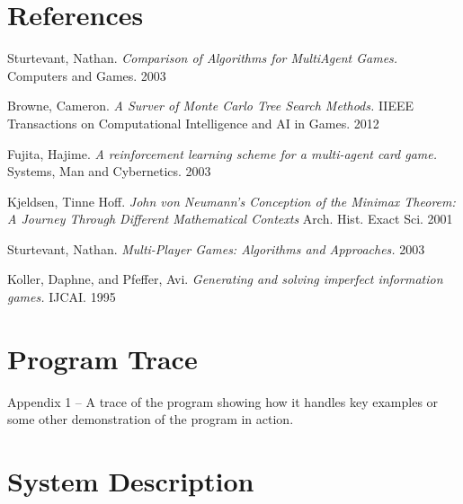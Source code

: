 \documentclass[11pt]{article}
\begin{document}
\section{References}

\begin{thebibliography}{5}

	Sturtevant, Nathan.
	\emph{Comparison of Algorithms for MultiAgent Games.}
	Computers and Games.
	2003

	Browne, Cameron.
	\emph{A Surver of Monte Carlo Tree Search Methods.}
	IIEEE Transactions on Computational Intelligence and AI in Games. 
	2012

	Fujita, Hajime.
	\emph{A reinforcement learning scheme for a multi-agent card game.}
	Systems, Man and Cybernetics.
	2003

	Kjeldsen, Tinne Hoff.
	\emph{John von Neumann’s Conception of the Minimax Theorem: A Journey Through Different Mathematical Contexts}
	Arch. Hist. Exact Sci.
	2001
	
	Sturtevant, Nathan.
	\emph{Multi-Player Games: Algorithms and Approaches.}
	2003
	
	Koller, Daphne, and Pfeffer, Avi.
	\emph{Generating and solving imperfect information games.}
	IJCAI.
	1995
	
\end{thebibliography}

\appendix

\section{Program Trace}

Appendix 1 – A trace of the program showing how it handles key examples or some other demonstration of the program in action.

\section{System Description}
\end{document}
